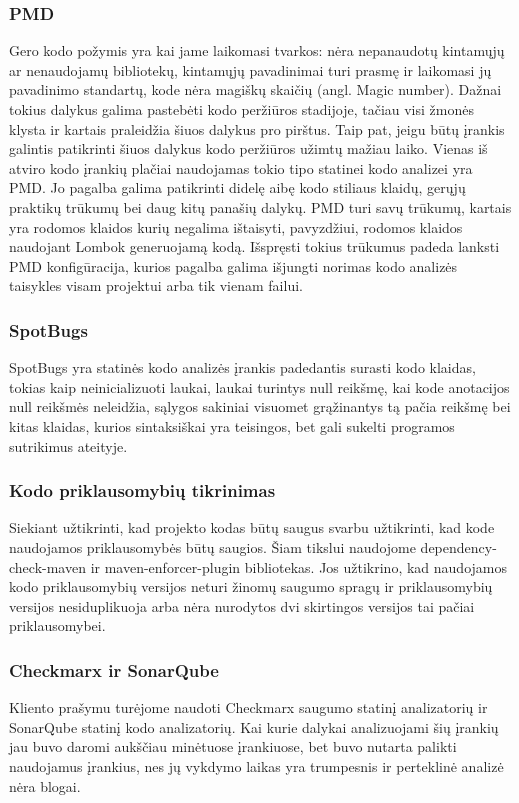 \documentclass{VUMIFPSkursinis}
\begin{document}
		\subsubsection{PMD}
			Gero kodo požymis yra kai jame laikomasi tvarkos: nėra nepanaudotų kintamųjų ar nenaudojamų bibliotekų, kintamųjų pavadinimai turi prasmę ir laikomasi jų pavadinimo standartų, kode nėra magiškų skaičių (angl. Magic number). Dažnai tokius dalykus galima pastebėti kodo peržiūros stadijoje, tačiau visi žmonės klysta ir kartais praleidžia šiuos dalykus pro pirštus. Taip pat, jeigu būtų įrankis galintis patikrinti šiuos dalykus kodo peržiūros užimtų mažiau laiko.
			Vienas iš atviro kodo įrankių plačiai naudojamas tokio tipo statinei kodo analizei yra PMD. Jo pagalba galima patikrinti didelę aibę kodo stiliaus klaidų, gerųjų praktikų trūkumų bei daug kitų panašių dalykų.
			PMD turi savų trūkumų, kartais yra rodomos klaidos kurių negalima ištaisyti, pavyzdžiui, rodomos klaidos naudojant Lombok generuojamą kodą.
			Išspręsti tokius trūkumus padeda lanksti PMD konfigūracija, kurios pagalba galima išjungti norimas kodo analizės taisykles visam projektui arba tik vienam failui.
		\subsubsection{SpotBugs}
			SpotBugs yra statinės kodo analizės įrankis padedantis surasti kodo klaidas, tokias kaip neinicializuoti laukai, laukai turintys null reikšmę, kai kode anotacijos null reikšmės neleidžia, sąlygos sakiniai visuomet grąžinantys tą pačia reikšmę bei kitas klaidas, kurios sintaksiškai yra teisingos, bet gali sukelti programos sutrikimus ateityje.
		\subsubsection{Kodo priklausomybių tikrinimas}
			Siekiant užtikrinti, kad projekto kodas būtų saugus svarbu užtikrinti, kad kode naudojamos priklausomybės būtų saugios.
			Šiam tikslui naudojome dependency-check-maven ir maven-enforcer-plugin bibliotekas. Jos užtikrino, kad naudojamos kodo priklausomybių versijos neturi žinomų saugumo spragų ir priklausomybių versijos nesiduplikuoja arba nėra nurodytos dvi skirtingos versijos tai pačiai priklausomybei.
		\subsubsection{Checkmarx ir SonarQube}
			Kliento prašymu turėjome naudoti Checkmarx saugumo statinį analizatorių ir SonarQube statinį kodo analizatorių.
			Kai kurie dalykai analizuojami šių įrankių jau buvo daromi aukščiau minėtuose įrankiuose, bet buvo nutarta palikti naudojamus įrankius, nes jų vykdymo laikas yra trumpesnis ir perteklinė analizė nėra blogai.
\end{document}
